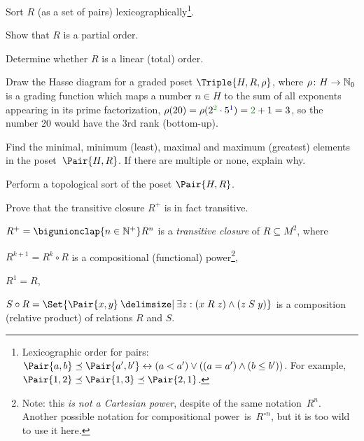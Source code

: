 \documentclass[a4paper,12pt]{article}
\begin{document}
\begin{tasks}
    \begin{subtasks}
        \item Sort $R$ (as a set of pairs) lexicographically\footnote{Lexicographic order for pairs: $\Pair{a,b} \preceq \Pair{a',b'} \iff (a < a') \lor ((a = a') \land (b \leq b'))$. For example, $\Pair{1,2} \preceq \Pair{1,3} \preceq \Pair{2,1}$.}.

        \item Show that $R$ is a partial order.

        \item Determine whether $R$ is a linear (total) order.

        \item Draw the Hasse diagram for a graded poset $\Triple{H, R, \rho}$, where $\rho \colon H \to \mathbb{N}_{0}$ is a grading function which maps a number $n \in H$ to the sum of all exponents appearing in its prime factorization, \eg $\rho(20) = \rho(2^{\mathcolor{my-green}{2}} \cdot 5^{\textcolor{my-blue}{1}}) = \mathcolor{my-green}{2} + \textcolor{my-blue}{1} = 3$, so the number 20 would have the 3rd rank (bottom-up).

        \item Find the minimal, minimum (least), maximal and maximum (greatest) elements in the poset~$\Pair{H, R}$.
        If there are multiple or none, explain why.

        \item Perform a topological sort of the poset $\Pair{H, R}$.
    \end{subtasks}


    \item Prove that the transitive closure $R^{+}$ is in fact transitive.

    \begin{definition}
        $R^{+} = \bigunionclap{n \in \NaturalPlus} R^n$ is a \textit{transitive closure} of $R \subseteq M^2$, where
        \begin{terms}
            \item $R^{k+1} = R^k \circ R$ is a compositional (functional) power\footnote{Note: this \emph{is not a Cartesian power}, despite of the same notation~$R^n$. Another possible notation for compositional power~is~$R^{\circ n}$, but it is too wild to use it here.},
            \item $R^1 = R$,
            \item $S \circ R = \Set{\Pair{x,y} \given \exists z : (x \rel[R] z) \land (z \rel[S] y)}$ is a composition (relative product) of relations $R$ and $S$.
        \end{terms}
    \end{definition}



\end{tasks}
\end{document}
